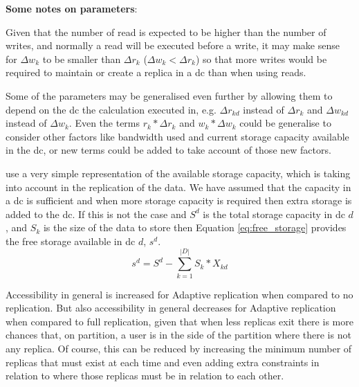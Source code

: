 \documentclass[english]{article}
\begin{document}
{\bf Some notes on parameters}: 

Given that the number of read is expected to be higher than the number of writes, and normally a read will be executed before a write, it may make sense for $\Delta w_{k}$ to be smaller than $\Delta r_{k}$ ($\Delta w_{k} < \Delta r_{k}$) so that more writes would be required to maintain or create a replica in a \gls{dc} than when using reads.

Some of the parameters may be generalised even further by allowing them to depend on the \gls{dc} the calculation executed in, e.g. $\Delta r_{kd}$ instead of $\Delta r_{k}$ and $\Delta w_{kd}$ instead of $\Delta w_{k}$. Even the terms $r_{k} * \Delta r_{k}$ and $w_{k} * \Delta w_{k}$ could be generalise to consider other factors like bandwidth used and current storage capacity available in the \gls{dc}, or new terms could be added to take account of those new factors.

\citet{Paiva2013a} use a very simple representation of the available storage capacity, which is taking into account in the replication of the data. We have assumed that the capacity in a \gls{dc} is sufficient and when more storage capacity is required then extra storage is added to the \gls{dc}. If this is not the case and $S^{d}$ is the total storage capacity in \gls{dc} $d$, and $S_{k}$ is the size of the data to store then Equation \ref{eq:free_storage} provides the free storage available in \gls{dc} $d$, $s^{d}$.
\begin{equation} \label{eq:free_storage}
	s^{d} = S^{d} - \sum^{|D|}_{k = 1} S_{k} * X_{kd}
\end{equation}

Accessibility in general is increased for Adaptive replication when compared to no replication. But also accessibility in general decreases for Adaptive replication when compared to full replication, given that when less replicas exit there is more chances that, on partition, a user is in the side of the partition where there is not any replica. Of course, this can be reduced by increasing the minimum number of replicas that must exist at each time and even adding extra constraints in relation to where those replicas must be in relation to each other.
\end{document}
